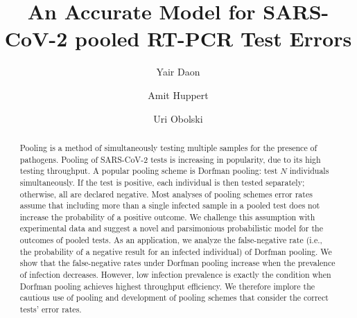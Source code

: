 \documentclass{article}
\begin{document}
\title{An Accurate Model for SARS-CoV-2 pooled RT-PCR Test Errors}

\author[1,2]{Yair Daon}
\author[1,3,*]{Amit Huppert}
\author[1,2,*]{Uri Obolski}



\date{}

\maketitle

\begin{abstract}
Pooling is a method of simultaneously testing multiple samples for the
presence of pathogens. Pooling of SARS-CoV-2 tests is increasing in
popularity, due to its high testing throughput. A popular pooling
scheme is Dorfman pooling: test $N$ individuals simultaneously. If the
test is positive, each individual is then tested separately;
otherwise, all are declared negative. Most analyses of pooling schemes
error rates assume that including more than a single infected sample
in a pooled test does not increase the probability of a positive
outcome. We challenge this assumption with experimental data and
suggest a novel and parsimonious probabilistic model for the outcomes
of pooled tests. As an application, we analyze the false-negative rate
(i.e., the probability of a negative result for an infected
individual) of Dorfman pooling. We show that the false-negative rates
under Dorfman pooling increase when the prevalence of infection
decreases. However, low infection prevalence is exactly the condition
when Dorfman pooling achieves highest throughput efficiency. We
therefore implore the cautious use of pooling and development of
pooling schemes that consider the correct tests' error rates.
\end{abstract}
\newpage
\end{document}
